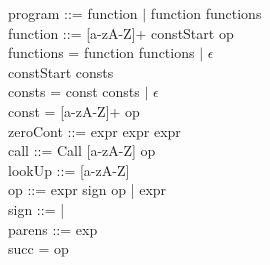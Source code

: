 program ::= function $\mid$ function functions\\

function ::= [a-zA-Z]+ \bnf{=>} constStart op\\

functions = \bnf{,} function functions $\mid$ $\epsilon$\\

constStart \bnf{[} consts \bnf{]}\\

consts = const \bnf{,} consts $\mid$ $\epsilon$\\

const = [a-zA-Z]+ \bnf{=} op\\

zeroCont ::=  \bnf{(} expr \bnf{)} \bnf{\{} expr \bnf{\}}  \bnf{\{} expr \bnf{\}}\\

call ::= Call [a-zA-Z] op\\

lookUp ::=  [a-zA-Z]\\

op ::= expr sign op | expr\\

sign ::= \bnf{+} | \bnf{*}\\

parens ::=\bnf{(} exp \bnf{)}\\

succ =  op\\

